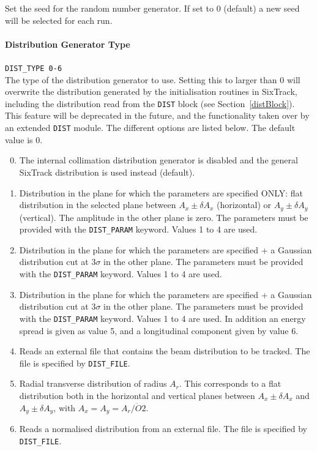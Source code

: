 Set the seed for the random number generator.
If set to 0 (default) a new seed will be selected for each run.

\paragraph{Distribution Generator Type} \texttt{DIST\_TYPE 0-6}\\

The type of the distribution generator to use.
Setting this to larger than 0 will overwrite the distribution generated by the initialisation routines in SixTrack, including the distribution read from the \texttt{DIST} block (see Section~\ref{distBlock}).
This feature will be deprecated in the future, and the functionality taken over by an extended \texttt{DIST} module.
The different options are listed below.
The default value is 0.

\begin{enumerate}
    \setcounter{enumi}{-1}
    \item The internal collimation distribution generator is disabled and the general SixTrack distribution is used instead (default).
    \item Distribution in the plane for which the parameters are specified ONLY: flat distribution in the selected plane between $A_x \pm \delta A_x$ (horizontal) or $A_y \pm \delta A_y$ (vertical). The amplitude in the other plane is zero. The parameters must be provided with the \texttt{DIST\_PARAM} keyword. Values 1 to 4 are used.
    \item Distribution in the plane for which the parameters are specified + a Gaussian distribution cut at $3\sigma$ in the other plane. The parameters must be provided with the \texttt{DIST\_PARAM} keyword. Values 1 to 4 are used.
    \item Distribution in the plane for which the parameters are specified + a Gaussian distribution cut at $3\sigma$ in the other plane. The parameters must be provided with the \texttt{DIST\_PARAM} keyword. Values 1 to 4 are used. In addition an energy spread is given as value 5, and a longitudinal component given by value 6.
    \item Reads an external file that contains the beam distribution to be tracked. The file is specified by \texttt{DIST\_FILE}.
    \item Radial transverse distribution of radius $A_r$. This corresponds to a flat distribution both in the horizontal and vertical planes between $A_x \pm \delta A_x$ and $A_y \pm \delta A_y$, with $A_x = A_y = A_r/\ddot{O}2$.
    \item Reads a normalised distribution from an external file. The file is specified by \texttt{DIST\_FILE}.
\end{enumerate}

